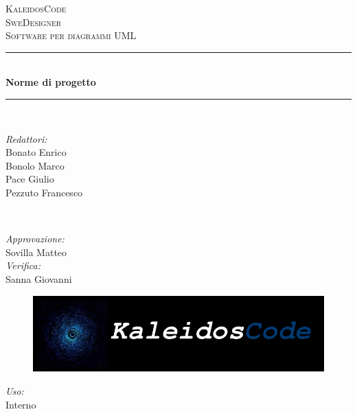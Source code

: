\documentclass[a4paper]{report}
\begin{document}
	
	\begin{titlepage}
		\newcommand{\HRule}{\rule{\linewidth}{0.5mm}} 
		\center  
		
		\textsc{\LARGE KaleidosCode}\\[1.5cm] 
		\textsc{\Large SweDesigner}\\[0.5cm] 
		\textsc{\large Software per diagrammi UML}\\[0.5cm]
		
		
		\HRule \\[0.4cm]
		{ \huge \bfseries Norme di progetto}\\[0.4cm] 
		\HRule \\[1.5cm]
		
		\begin{minipage}{0.4\textwidth}
			\begin{flushleft} \large
				\emph{Redattori:}\\
				Bonato Enrico\\
				Bonolo Marco\\
				Pace Giulio\\
				Pezzuto Francesco\\
			\end{flushleft}
		\end{minipage}
		~
		\begin{minipage}{0.4\textwidth}
			\begin{flushright} \large
				\emph{Approvazione:} \\
				Sovilla Matteo\\
				\emph{Verifica:} \\
				Sanna Giovanni
			\end{flushright}
		\end{minipage}
		
		\begin{figure}[H]
			\centering
			\includegraphics[width=\textwidth]{Figures/KaleidosCodeLogo.png}
		\end{figure}
		
		\begin{minipage}{0.4\textwidth}
			\begin{flushleft} \large
				\emph{Uso:}\\
				Interno \\
				

\end{flushleft}
\end{minipage}
\end{titlepage}
\end{document}

